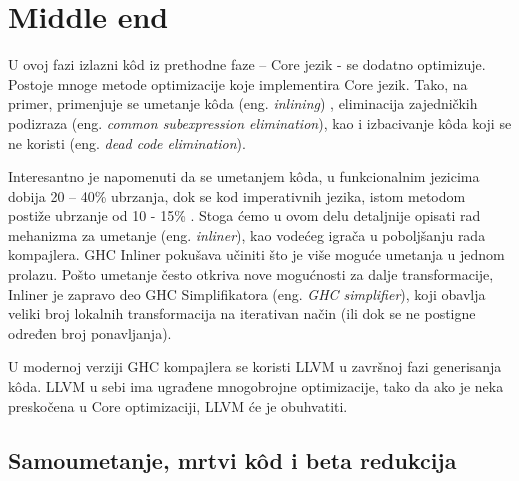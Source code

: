 \section{Middle end}
\label{sec:middle}

U ovoj fazi izlazni k\^{o}d iz prethodne faze – Core jezik - se dodatno optimizuje. Postoje mnoge metode optimizacije koje implementira Core jezik. Tako, na primer, primenjuje se umetanje k\^{o}da (eng. \emph{inlining}) \cite{inliner}, eliminacija zajedničkih podizraza (eng. \emph{common subexpression elimination}), kao i izbacivanje k\^{o}da koji se ne koristi (eng. \emph{dead code elimination}).

Interesantno je napomenuti da se umetanjem k\^{o}da, u funkcionalnim jezicima dobija 20 – 40\% ubrzanja, dok se kod imperativnih jezika, istom metodom postiže ubrzanje od 10 - 15\% \cite{Cinliner}. Stoga ćemo u ovom delu detaljnije opisati rad mehanizma za umetanje (eng. \emph{inliner}), kao vodećeg igrača u poboljšanju rada kompajlera. GHC Inliner pokušava učiniti što je više moguće umetanja u jednom prolazu. Pošto umetanje često otkriva nove mogućnosti za dalje transformacije, Inliner je zapravo deo GHC Simplifikatora (eng. \emph{GHC simplifier}), koji obavlja veliki broj lokalnih transformacija na iterativan način (ili dok se ne postigne određen broj ponavljanja).

U modernoj verziji GHC kompajlera se koristi LLVM u završnoj fazi generisanja k\^{o}da. LLVM u sebi ima ugrađene mnogobrojne optimizacije, tako da ako je neka preskočena u Core optimizaciji, LLVM će je obuhvatiti.

\subsection{Samoumetanje, mrtvi k\^{o}d i beta redukcija}
\label{subsec:podnaslovInlineBeta}

